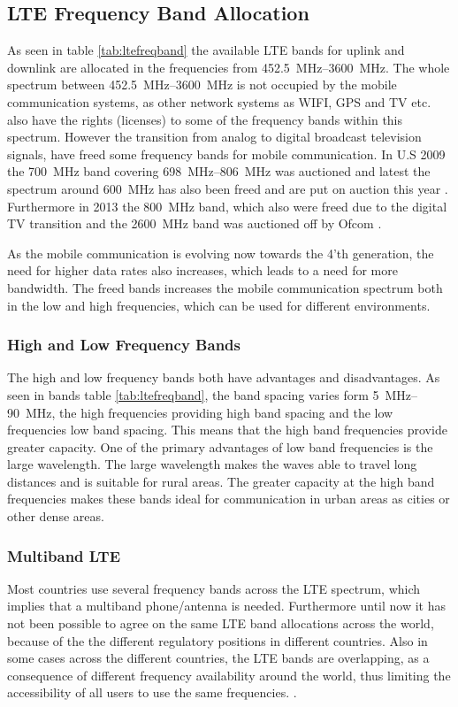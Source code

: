 \subsection{LTE Frequency Band Allocation}
As seen in table \ref{tab:ltefreqband} the available LTE bands for uplink and downlink are allocated in the frequencies from \SIrange{452.5}{3600}{MHz}. The whole spectrum between \SIrange{452.5}{3600}{MHz} is not occupied by the mobile communication systems, as other network systems as WIFI, GPS and TV etc. also have the rights (licenses) to some of the frequency bands within this spectrum.
However the transition from analog to digital broadcast television signals, have freed some frequency bands for mobile communication. In U.S 2009 the \SI{700}{MHz} band covering \SIrange{698}{806}{MHz} was auctioned and latest the spectrum around \SI{600}{MHz} has also been freed and are put on auction this year \cite{Samantha2015tunableAntennas}. Furthermore in 2013 the \SI{800}{MHz} band, which also were freed due to the digital TV transition and the \SI{2600}{MHz} band was auctioned off by Ofcom \cite{james2014lte}.   

As the mobile communication is evolving now towards the 4'th generation, the need for higher data rates also increases, which leads to a need for more bandwidth. The freed bands increases the mobile communication spectrum both in the low and high frequencies, which can be used for different environments.  

\subsubsection{High and Low Frequency Bands}
The high and low frequency bands both have advantages and disadvantages. As seen in bands table \ref{tab:ltefreqband}, the band spacing varies form \SIrange{5}{90}{MHz}, the high frequencies providing high band spacing and the low frequencies low band spacing. This means that the high band frequencies provide greater capacity. One of the primary advantages of low band frequencies is the large wavelength. The large wavelength makes the waves able to travel long distances and is suitable for rural areas. The greater capacity at the high band frequencies makes these bands ideal for communication in urban areas as cities or other dense areas.

\subsubsection{Multiband LTE}
Most countries use several frequency bands across the LTE spectrum, which implies that a multiband phone/antenna is needed.  
Furthermore until now it has not been possible to agree on the same LTE band allocations across the world, because of the the different regulatory positions in different countries. Also in some cases across the different countries, the LTE bands are overlapping, as a consequence of different frequency availability around the world, thus limiting the accessibility of all users to use the same frequencies. \cite{radio2015electronics}.  

